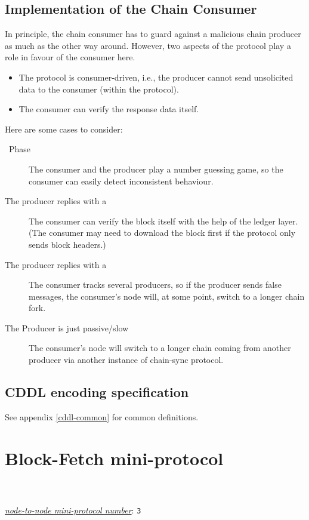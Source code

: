 \subsection{Implementation of the Chain Consumer}
In principle, the chain consumer has to guard against a malicious chain producer
as much as the other way around.
However, two aspects of the protocol play a role in favour of the consumer here.
\begin{itemize}
  \item The protocol is consumer-driven, i.e., the producer cannot send unsolicited
data to the consumer (within the protocol).
  \item The consumer can verify the response data itself.
\end{itemize}
Here are some cases to consider:
\begin{description}
\item[\MsgFindIntersect~Phase]
  The consumer and the producer play a number guessing game, so the consumer can easily detect
  inconsistent behaviour.
\item[The producer replies with a \MsgRollForward] The consumer can verify the block itself
  with the help of the ledger layer.
  (The consumer may need to download the block first if the protocol only sends block headers.)
\item[The producer replies with a \MsgRollBackward] The consumer tracks several producers, so
  if the producer sends false \MsgRollBackward{} messages, the consumer's node
  will, at some point, switch to a longer chain fork.
\item[The Producer is just passive/slow] The consumer's node will switch to
  a longer chain coming from another producer via another instance of
    chain-sync protocol.
\end{description}

\subsection{CDDL encoding specification}

See appendix \ref{cddl-common} for common definitions.

\section{Block-Fetch mini-protocol}
\label{block-fetch-protocol}
\\
\\
\hyperref[table:node-to-node-protocol-numbers]{\textit{node-to-node mini-protocol number}}: \texttt{3}\\

